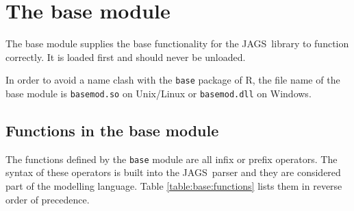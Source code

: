 \documentclass[11pt, a4paper, titlepage]{report}
\newcommand{\JAGS}{\textsf{JAGS}}
\newcommand{\R}{\textsf{R}}
\begin{document}




\chapter{The base module}

The base module supplies the base functionality for the \JAGS\ library
to function correctly. It is loaded first and should never be
unloaded.

In order to avoid a name clash with the \texttt{base} package of \R,
the file name of the base module is \texttt{basemod.so} on Unix/Linux
or \texttt{basemod.dll} on Windows.

\section{Functions in the base module}
\label{section:base:functions}

The functions defined by the \texttt{base} module are all infix or
prefix operators. The syntax of these operators is built into the
\JAGS\ parser and they are considered part of the modelling language.
Table \ref{table:base:functions} lists them in reverse order of
precedence.
\end{document}
